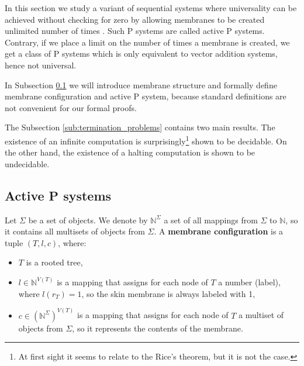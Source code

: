 In this section we study a variant of sequential systems where universality can be achieved without checking for zero by allowing membranes to be created unlimited number of times \cite{Ibarra05Active}. Such P systems are called active P systems. Contrary, if we place a limit on the number of times a membrane is created, we get a class of P systems which is only equivalent to vector addition systems, hence not universal.

In Subsection \ref{sub:active_p_systems} we will introduce membrane structure and formally define membrane configuration and active P system, because standard definitions are not convenient for our formal proofs.

The Subsection \ref{sub:termination_problems} contains two main results. The existence of an infinite computation is surprisingly\footnote{At first sight it seems to relate to the Rice's theorem, but it is not the case.} shown to be decidable.
On the other hand, the existence of a halting computation is shown to be undecidable.

\subsection{Active P systems} %
\label{sub:active_p_systems}

\begin{definition}
  \label{def:membrane_structure}
  Let $\Sigma$ be a set of objects. We denote by $\mathbb N^\Sigma$ a set of all mappings from $\Sigma$ to $\mathbb N$, so it contains all multisets of objects from $\Sigma$. A {\bf membrane configuration} is a tuple $(T, l, c)$, where:
  \begin{itemize}
    \item $T$ is a rooted tree,
    \item $l\in\mathbb N^{V(T)}$ is a mapping that assigns for each node of $T$ a number (label), where $l(r_T)=1$, so the skin membrane is always labeled with 1,
    \item $c\in(\mathbb N^\Sigma)^{V(T)}$ is a mapping that assigns for each node of $T$ a multiset of objects from $\Sigma$, so it represents the contents of the membrane.
  \end{itemize}
\end{definition}

